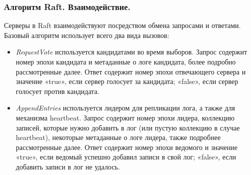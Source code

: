 \documentclass[pdf, 10pt, unicode,aspectratio=169]{beamer} %
\begin{document}
\begin{frame}
\frametitle{Алгоритм Raft. Взаимодействие.}

Серверы в Raft взаимодействуют посредством обмена запросами и ответами. Базовый алгоритм использует всего два вида вызовов: 
\begin{itemize}
\item \emph{RequestVote} используется кандидатами во время выборов. Запрос содержит номер эпохи кандидата и метаданные о логе кандидата, более подробно рассмотренные далее. Ответ содержит номер эпохи отвечающего сервера и значение «true», если сервер голосует за кандидата; «false», если сервер голосует против кандидата.
\item \emph{AppendEntries} используется лидером для репликации лога, а также для механизма heartbeat. Запрос содержит номер эпохи лидера, коллекцию записей, которые нужно добавить в лог (или пустую коллекцию в случае heartbeat), некоторые метаданные о логе лидера, также подробнее рассмотренные далее. Ответ содержит номер эпохи ведомого и значение «true», если ведомый успешно добавил записи в свой лог; «false», если добавить записи в лог не удалось.
\end{itemize}


\end{frame}
\end{document}
